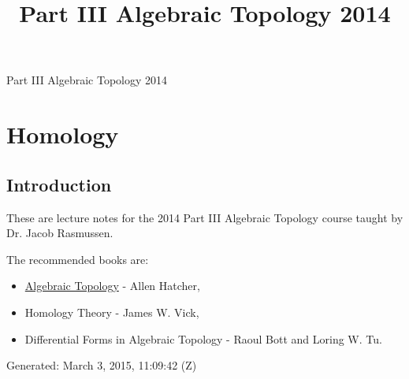 \documentclass[10pt,]{book}
\title{Part III Algebraic Topology 2014}
\author{}
\date{}
\theoremstyle{plain}
\theoremstyle{definition}
\numberwithin{equation}{section}
\begin{document}
\frontmatter
\thispagestyle{empty}
\begin{center}
{\Huge Part III Algebraic Topology 2014}
\end{center}\par
{}
\clearpage
\thispagestyle{empty}
\clearpage
\maketitle
\clearpage
\thispagestyle{empty}
\clearpage
\setcounter{tocdepth}{1}
\renewcommand*\contentsname{Contents}
\tableofcontents
\mainmatter
\typeout{************************************************}
\typeout{************************************************}
\chapter[Homology]{Homology}\label{chap-homology}
\typeout{************************************************}
\typeout{************************************************}
\section[Introduction]{Introduction}\label{sec-introduction}

          These are lecture notes for the 2014 Part III Algebraic Topology course taught by Dr. Jacob Rasmussen.
\par

          The recommended books are:
          \begin{itemize}
\item{}\href{http://www.math.cornell.edu/~hatcher/AT/ATpage.html}{Algebraic Topology} - Allen Hatcher,\item{}Homology Theory - James W. Vick,\item{}Differential Forms in Algebraic Topology - Raoul Bott and Loring W. Tu.\end{itemize}

\par

          Generated: March 3, 2015, 11:09:42 (Z)
\typeout{************************************************}
\typeout{************************************************}
\end{document}
